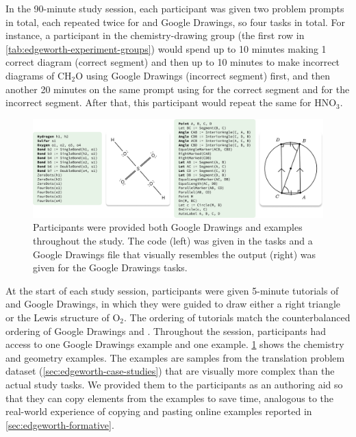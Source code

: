 In the 90-minute study session, each participant was given two problem prompts in total, each repeated twice for \Edgeworth and Google Drawings, so four tasks in total. For instance, a participant in the chemistry-drawing group (the first row in \cref{tab:edgeworth-experiment-groups}) would spend up to 10 minutes making 1 correct diagram (correct segment) and then up to 10 minutes to make incorrect diagrams of \ensuremath{\mathrm{CH_2O}} using Google Drawings (incorrect segment) first, and then another 20 minutes on the same prompt using \Penrose for the correct segment and \Edgeworth for the incorrect segment. After that, this participant would repeat the same for  \ensuremath{\mathrm{HNO_3}}.




\begin{figure}
    \centering
    \includegraphics[width=\linewidth]{assets/edgeworth-eval/user-study-examples.pdf}
    \caption{Participants were provided both Google Drawings and \Substance examples throughout the study. The \SubstanceColored code (left) was given in the \Edgeworth tasks and a Google Drawings file that visually resembles the \Penrose output (right) was given for the Google Drawings tasks.}
    \label{fig:edgeworth-user-study-examples}
\end{figure}

At the start of each study session, participants were given 5-minute tutorials of \Edgeworth and Google Drawings, in which they were guided to draw either a right triangle or the Lewis structure of \ensuremath{\mathrm{O_2}}. The ordering of tutorials match the counterbalanced ordering of Google Drawings and \Edgeworth. Throughout the session, participants had access to one Google Drawings example and one \Substance example. \cref{fig:edgeworth-user-study-examples} shows the chemistry and geometry examples. The examples are samples from the translation problem dataset (\cref{sec:edgeworth-case-studies}) that are visually more complex than the actual study tasks. We provided them to the participants as an authoring aid so that they can copy elements from the examples to save time, analogous to the real-world experience of copying and pasting online examples reported in \cref{sec:edgeworth-formative}.

